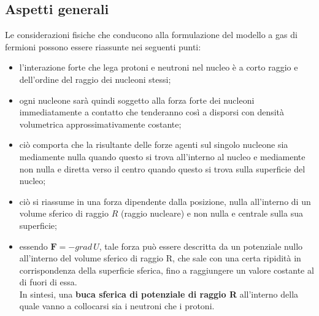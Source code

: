 \subsection{Aspetti generali}\label{sec:aspetti-generali}

Le considerazioni fisiche che conducono alla formulazione del modello a gas di fermioni possono essere riassunte nei seguenti punti:
\begin{itemize}
	\item l’interazione forte che lega protoni e neutroni nel nucleo è a corto raggio
	e dell’ordine del raggio dei nucleoni stessi;
	\item ogni nucleone sarà quindi soggetto alla forza forte dei nucleoni
	immediatamente a contatto che tenderanno così a disporsi con densità
	volumetrica approssimativamente costante;
	\item ciò comporta che la risultante delle forze agenti sul singolo nucleone sia
	mediamente nulla quando questo si trova all’interno al nucleo e mediamente non nulla e diretta verso il centro quando questo si trova sulla superficie del nucleo;
	\item ciò si riassume in una forza dipendente dalla posizione, nulla all’interno di un volume sferico di raggio $R$ (raggio nucleare) e non nulla e centrale sulla sua superficie;
	\item essendo $ \bm{F} = - grad \, U$, tale forza può essere descritta da un potenziale
	nullo all’interno del volume sferico di raggio R, che sale con una certa ripidità in corrispondenza della superficie sferica,
	fino a raggiungere un valore costante al di fuori di essa. \\
	In sintesi, una \textbf{buca sferica di potenziale di raggio R} all’interno della quale vanno a collocarsi sia i neutroni che i protoni.
\end{itemize}
\bisgkip

